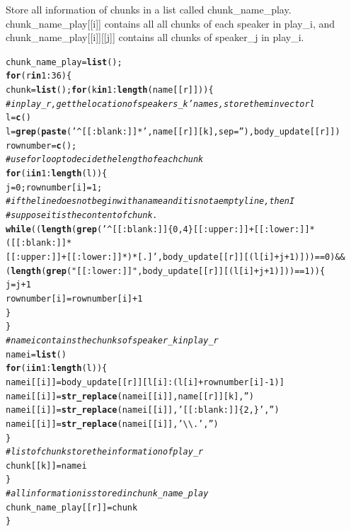 \documentclass{article}\usepackage[]{graphicx}\usepackage[]{color}
\makeatletter
\newcommand{\hlnum}[1]{\textcolor[rgb]{0.686,0.059,0.569}{#1}}%
\newcommand{\hlstr}[1]{\textcolor[rgb]{0.192,0.494,0.8}{#1}}%
\newcommand{\hlcom}[1]{\textcolor[rgb]{0.678,0.584,0.686}{\textit{#1}}}%
\newcommand{\hlopt}[1]{\textcolor[rgb]{0,0,0}{#1}}%
\newcommand{\hlstd}[1]{\textcolor[rgb]{0.345,0.345,0.345}{#1}}%
\newcommand{\hlkwa}[1]{\textcolor[rgb]{0.161,0.373,0.58}{\textbf{#1}}}%
\newcommand{\hlkwb}[1]{\textcolor[rgb]{0.69,0.353,0.396}{#1}}%
\newcommand{\hlkwc}[1]{\textcolor[rgb]{0.333,0.667,0.333}{#1}}%
\newcommand{\hlkwd}[1]{\textcolor[rgb]{0.737,0.353,0.396}{\textbf{#1}}}%
\newenvironment{kframe}{%
 \def\at@end@of@kframe{}%
 \ifinner\ifhmode%
  \def\at@end@of@kframe{\end{minipage}}%
  \begin{minipage}{\columnwidth}%
 \fi\fi%
 \def\FrameCommand##1{\hskip\@totalleftmargin \hskip-\fboxsep
 \colorbox{shadecolor}{##1}\hskip-\fboxsep
     \hskip-\linewidth \hskip-\@totalleftmargin \hskip\columnwidth}%
 \MakeFramed {\advance\hsize-\width
   \@totalleftmargin\z@ \linewidth\hsize
   \@setminipage}}%
 {\par\unskip\endMakeFramed%
 \at@end@of@kframe}
\newenvironment{knitrout}{}{} %
\makeatother
\begin{document}
Store all information of chunks in a list called chunk\_name\_play. chunk\_name\_play{[[i]]} contains all all chunks of each speaker in play\_i, and chunk\_name\_play{[[i]][[j]]} contains all chunks of speaker\_j in play\_i. 
\begin{knitrout}
\color{fgcolor}\begin{kframe}
\begin{alltt}
\hlstd{chunk_name_play}\hlkwb{=}\hlkwd{list}\hlstd{();}
\hlkwa{for}\hlstd{(r} \hlkwa{in} \hlnum{1}\hlopt{:}\hlnum{36}\hlstd{)\{}
  \hlstd{chunk}\hlkwb{=}\hlkwd{list}\hlstd{();}\hlkwa{for}\hlstd{(k} \hlkwa{in} \hlnum{1}\hlopt{:}\hlkwd{length}\hlstd{(name[[r]]))\{}
     \hlcom{# in play_r,get the location of speakers_k'names,store them in vector l}
     \hlstd{l}\hlkwb{=}\hlkwd{c}\hlstd{()}
     \hlstd{l}\hlkwb{=}\hlkwd{grep}\hlstd{(}\hlkwd{paste}\hlstd{(}\hlstr{'^[[:blank:]]*'}\hlstd{,name[[r]][k],}\hlkwc{sep}\hlstd{=}\hlstr{''}\hlstd{),body_update[[r]])}
     \hlstd{rownumber}\hlkwb{=}\hlkwd{c}\hlstd{();}
     \hlcom{# use for loop to decide the length of each chunk}
     \hlkwa{for}\hlstd{(i} \hlkwa{in} \hlnum{1}\hlopt{:}\hlkwd{length}\hlstd{(l))\{}
         \hlstd{j}\hlkwb{=}\hlnum{0}\hlstd{;rownumber[i]}\hlkwb{=}\hlnum{1}\hlstd{;}
         \hlcom{# if the line does not begin with a name and it is not a empty line, then I }
         \hlcom{#suppose it is the content of chunk.}
          \hlkwa{while}\hlstd{((}\hlkwd{length}\hlstd{(}\hlkwd{grep}\hlstd{(}\hlstr{'^[[:blank:]]\{0,4\}[[:upper:]]+[[:lower:]]*([[:blank:]]*
[[:upper:]]+[[:lower:]]*)*[.]'}\hlstd{,body_update[[r]][(l[i]}\hlopt{+}\hlstd{j}\hlopt{+}\hlnum{1}\hlstd{)]))}\hlopt{==}\hlnum{0}\hlstd{)}\hlopt{&&}
\hlstd{(}\hlkwd{length}\hlstd{(}\hlkwd{grep}\hlstd{(}\hlstr{"[[:lower:]]"}\hlstd{,body_update[[r]][(l[i]}\hlopt{+}\hlstd{j}\hlopt{+}\hlnum{1}\hlstd{)]))}\hlopt{==}\hlnum{1}\hlstd{))\{}
             \hlstd{j}\hlkwb{=}\hlstd{j}\hlopt{+}\hlnum{1}
            \hlstd{rownumber[i]}\hlkwb{=}\hlstd{rownumber[i]}\hlopt{+}\hlnum{1}
          \hlstd{\}}
      \hlstd{\}}
      \hlcom{# namei contains the chunks of speaker_k in play_r}
     \hlstd{namei}\hlkwb{=}\hlkwd{list}\hlstd{()}
      \hlkwa{for}\hlstd{(i} \hlkwa{in} \hlnum{1}\hlopt{:}\hlkwd{length}\hlstd{(l))\{}
         \hlstd{namei[[i]]}\hlkwb{=}\hlstd{body_update[[r]][l[i]}\hlopt{:}\hlstd{(l[i]}\hlopt{+}\hlstd{rownumber[i]}\hlopt{-}\hlnum{1}\hlstd{)]}
         \hlstd{namei[[i]]}\hlkwb{=}\hlkwd{str_replace}\hlstd{(namei[[i]],name[[r]][k],}\hlstr{''}\hlstd{)}
         \hlstd{namei[[i]]}\hlkwb{=}\hlkwd{str_replace}\hlstd{(namei[[i]],}\hlstr{'[[:blank:]]\{2,\}'}\hlstd{,}\hlstr{''}\hlstd{)}
         \hlstd{namei[[i]]}\hlkwb{=}\hlkwd{str_replace}\hlstd{(namei[[i]],}\hlstr{'\textbackslash{}\textbackslash{}. '}\hlstd{,}\hlstr{''}\hlstd{)}
      \hlstd{\}}
      \hlcom{# list of chunk store the information of play_r}
      \hlstd{chunk[[k]]}\hlkwb{=}\hlstd{namei}
  \hlstd{\}}
  \hlcom{# all information is stored in chunk_name_play}
  \hlstd{chunk_name_play[[r]]}\hlkwb{=}\hlstd{chunk}
\hlstd{\}}
\end{alltt}
\end{kframe}
\end{knitrout}
\end{document}
